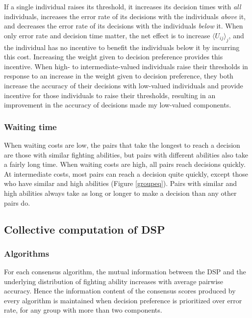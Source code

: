 \documentclass{pnastwo}
\begin{document}
\begin{article}
If a single individual raises its threshold, it increases its decision times with \emph{all} individuals, increases the error rate of its decisions with the individuals \emph{above} it, and decreases the error rate of its decisions with the individuals \emph{below} it. When only error rate and decision time matter, the net effect is to increase $\langle U_{ij}\rangle _j$, and the individual has no incentive to benefit the individuals below it by incurring this cost. Increasing the weight given to decision preference provides this incentive. When high- to intermediate-valued individuals raise their thresholds in response to an increase in the weight given to decision preference, they both increase the accuracy of their decisions with low-valued individuals and provide incentive for those individuals to raise their thresholds, resulting in an improvement in the accuracy of decisions made my low-valued components.  


\subsubsection{Waiting time }
When waiting costs are low, the pairs that take the longest to reach a decision are those with similar fighting abilities, but pairs with different abilities also take a fairly long time.  When waiting costs are high, all pairs reach decisions quickly.  At intermediate costs, most pairs can reach a decision quite quickly, except those who have similar and high abilities (Figure \ref{groupeq}).  Pairs with similar and high abilities always take as long or longer to make a decision than any other pairs do.

\subsection{Collective computation of DSP}
\subsubsection{Algorithms}
For each consensus algorithm, the mutual information between the DSP and the underlying distribution of fighting ability increases with average pairwise accuracy. Hence the information content of the consensus scores produced by every algorithm is maintained when decision preference is prioritized over error rate, for any group with more than two components. 


\end{article}
\end{document}
